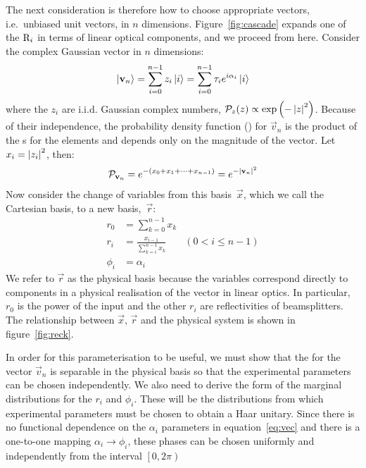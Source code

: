 The next consideration is therefore how to choose appropriate vectors, i.e.\
unbiased unit vectors, in \(n\) dimensions. Figure~\ref{fig:cascade} expands one
of the \(\mathrm{R}_{i}\) in terms of linear optical components, and we proceed
from here. Consider the complex Gaussian vector in \(n\) dimensions:
\begin{equation}
  \left|\mathbf{v}_{n}\right\rangle = \sum_{i=0}^{n-1} z_{i} \left|i\right\rangle = \sum_{i=0}^{n-1} \tau_{i}
  e^{i \alpha_{i}} \left|i\right\rangle
\end{equation}
where the \(z_i\) are i.i.d. Gaussian complex numbers, \( \mathcal{P}_{z} \!\left(z\right)
\propto \exp \left( -\left|z\right|^2 \right) \). Because of their independence, the
probability density function (\pdf{}) for \(\vec{v}_n\) is the product of the
\pdf{}s for the elements and depends only on the magnitude of the vector. Let
\(x_i = \left|z_i\right|^2 \), then:
\begin{equation}
  \label{eq:vec}
  \mathcal{P}_{\mathbf{v}_n} = e^{ -\left(x_0 + x_1 + \dots + x_{n-1} \right)} = e^{
  -\left|\mathbf{v}_n\right|^2}
\end{equation}
Now consider the change of variables from this basis~\(\vec{x}\), which we call
the Cartesian basis, to a new basis,~\(\vec{r}\):
\begin{align}
  r_0 &= \sum_{k=0}^{n-1} x_k \\
  r_i &= \frac{x_{i-1}}{\sum_{k=i}^{n-1} x_k} & \left( 0 < i \leq n-1 \right) \\
  \phi_i &= \alpha_{i}
\end{align}
We refer to \(\vec{r}\) as the physical basis because the variables
correspond directly to components in a physical realisation of the vector in
linear optics. In particular, \(r_0\) is the power of the input and the other
\(r_i\) are reflectivities of beamsplitters. The relationship between
\(\vec{x}\), \(\vec{r}\) and the physical system is shown in
figure~\ref{fig:reck}.

In order for this parameterisation to be useful, we must show that the \pdf{}
for the vector \(\vec{v}_n\) is separable in the physical basis so that the
experimental parameters can be chosen independently. We also need to derive the
form of the marginal distributions for the \(r_i\) and \(\phi_{i}\). These will
be the distributions from which experimental parameters must be chosen to
obtain a Haar unitary. Since there is no functional dependence on the
\(\alpha_{i}\) parameters in equation~\ref{eq:vec} and there is a one-to-one
mapping \(\alpha_{i} \rightarrow \phi_{i}\), these phases can be chosen
uniformly and independently from the interval \(\left[0,2\pi\right)\)

